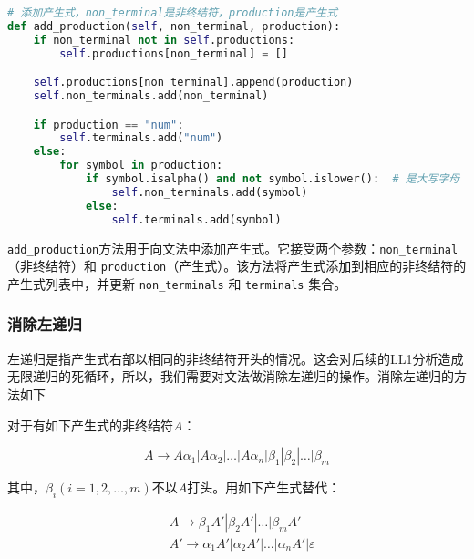 \documentclass[lang=cn,11pt,a4paper]{elegantpaper}
\begin{document}
\begin{lstlisting}[language=Python]
# 添加产生式，non_terminal是非终结符，production是产生式
def add_production(self, non_terminal, production):
    if non_terminal not in self.productions:
        self.productions[non_terminal] = []

    self.productions[non_terminal].append(production)
    self.non_terminals.add(non_terminal)

    if production == "num":
        self.terminals.add("num")
    else:
        for symbol in production:
            if symbol.isalpha() and not symbol.islower():  # 是大写字母
                self.non_terminals.add(symbol)
            else:
                self.terminals.add(symbol)
\end{lstlisting}

\lstinline{add_production}方法用于向文法中添加产生式。它接受两个参数：\lstinline{non_terminal}（非终结符）和 \lstinline{production}（产生式）。该方法将产生式添加到相应的非终结符的产生式列表中，并更新 \lstinline{non_terminals} 和 \lstinline{terminals} 集合。

\subsubsection{消除左递归}

左递归是指产生式右部以相同的非终结符开头的情况。这会对后续的LL1分析造成无限递归的死循环，所以，我们需要对文法做消除左递归的操作。消除左递归的方法如下

对于有如下产生式的非终结符$A$：

$$
A\rightarrow A\alpha_1|A\alpha_2|\ldots|A\alpha_n|\beta_1|\beta_2|\ldots|\beta_m
$$

其中，$\beta_i(i=1,2,\ldots,m)$不以$A$打头。用如下产生式替代：

$$
\begin{aligned}
& A\rightarrow \beta_1A'|\beta_2A'|\ldots|\beta_mA' \\
& A'\rightarrow \alpha_1A'|\alpha_2A'|\ldots|\alpha_nA'|\varepsilon
\end{aligned}
$$
\end{document}
